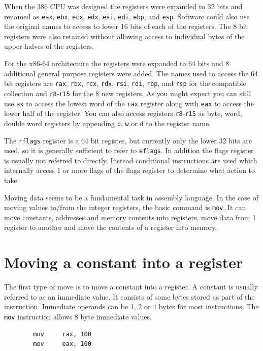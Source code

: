 \documentclass[11pt,b5paper]{book}
\begin{document}
When the 386 CPU was designed the registers were expanded to 32 bits and
renamed as {\tt eax}, {\tt ebx}, {\tt ecx}, {\tt edx}, {\tt esi}, {\tt edi},
{\tt ebp}, and {\tt esp}.
Software could also use the original names to access to lower 16 bits of each
of the registers.
The 8 bit registers were also retained without allowing access to individual
bytes of the upper halves of the registers.

For the x86-64 architecture the registers were expanded to 64 bits and 8
additional general purpose registers were added.
The names used to access the 64 bit registers are 
{\tt rax}, {\tt rbx}, {\tt rcx}, {\tt rdx}, {\tt rsi}, {\tt rdi},
{\tt rbp}, and {\tt rsp} for the compatible collection and {\tt r8}-{\tt r15}
for the 8 new registers.  
As you might expect you can still use {\tt ax} to access the lowest word of
the {\tt rax} register along with {\tt eax} to access the lower half of the
register.
You can also access registers {\tt r8}-{\tt r15} as byte, word, double word
registers by appending {\tt b}, {\tt w} or {\tt d} to the register name.

The {\tt rflags} register is a 64 bit register, but currently only the lower 
32 bits are used, so it is generally sufficient to refer to {\tt eflags}.
In addition the flags register is usually not referred to directly.  Instead
conditional instructions are used which internally access 1 or more flags of
the flags register to determine what action to take.

Moving data seems to be a fundamental task in assembly language.
In the case of moving values to/from the integer registers, the basic command
is {\tt mov}.
It can move constants, addresses and memory contents into registers, move data
from 1 register to another and move the contents of a register into memory.

\section{Moving a constant into a register}

The first type of move is to move a constant into a register. 
A constant is usually referred to as an immediate value. 
It consists of some bytes stored as part of the instruction.
Immediate operands can be 1, 2 or 4 bytes for most instructions.
The {\tt mov} instruction allows 8 byte immediate values.
\begin{verbatim}
        mov     rax, 100
        mov     eax, 100
\end{verbatim}
\end{document}
